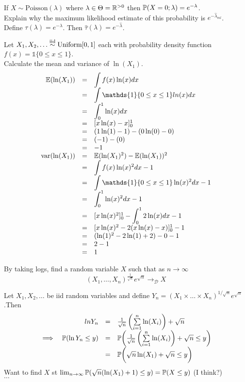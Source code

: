 \documentclass[11pt,a4paper]{article}
\begin{document}
\qpart
If $X\sim\text{Poisson}(\lambda)$ where $\lambda\in\Theta=\mathbb{R}^{>0}$ then $\mathbb{P}(X=0;\lambda)=e^{-\lambda}$.\\
Explain why the maximum likelihood estimate of this probability is $e^{-\hat{\lambda}_{ml}}$.\\

\apart
Define $\tau(\lambda)=e^{-\lambda}$. Then $\hat{\tau}(\lambda)=e^{-\hat{\lambda}}$.

\question
Let $X_1,X_2,\dots\overset{\text{iid}}{\sim}\text{Uniform}[0,1]$ each with probability density function $f(x)=\mathds{1}\{0\leq x\leq1\}$.\\

\qpartnb Calculate the mean and variance of $\ln(X_1)$.\\

\apart
\[\begin{array}{rcl}
\expect(\ln(X_1))&=&{\displaystyle\int f(x)\ln(x)dx}\\
&=&{\displaystyle\int\mathds{1}\{0\leq x\leq1\}ln(x)dx}\\
&=&{\displaystyle\int_0^1\ln(x)dx}\\
&=&[x\ln(x)-x]_0^1\\
&=&(1\ln(1)-1)-(0\ln(0)-0)\\
&=&(-1)-(0)\\
&=&-1\\
\var(\ln(X_1))&=&\expect(\ln(X_1)^2)-\expect(\ln(X_1))^2\\
&=&{\displaystyle\int f(x)\ln(x)^2dx-1}\\
&=&{\displaystyle\int \mathds{1}\{0\leq x\leq1\}\ln(x)^2dx-1}\\
&=&{\displaystyle\int_0^1\ln(x)^2dx-1}\\
&=&{[x\ln(x)^2]_0^1-\displaystyle\int_0^12\ln(x)dx-1}\\
&=&[x\ln(x)^2-2(x\ln(x)-x)]_0^1-1\\
&=&(\ln(1)^2-2\ln(1)+2)-0-1\\
&=&2-1\\
&=&1
\end{array}\]


\qpartnb By taking logs, find a random variable $X$ such that as $n\to\infty$
$$(X_1,\dots,X_n)^{\frac{1}{\sqrt{n}}}e^{\sqrt{n}}\to_\mathcal{D}X$$

\apart
Let $X_1,X_2,\dots$ be iid random variables and define $Y_n=(X_1\times\dots\times X_n)^{1/\sqrt{n}}e^{\sqrt{n}}$.Then
\[\begin{array}{rrcl}
&ln Y_n&=&\frac{1}{\sqrt{n}}\left(\sum\limits_{i=1}^n\ln(X_i)\right)+\sqrt{n}\\
\implies&\mathbb{P}(\ln Y_n\leq y)&=&\mathbb{P}\bigg(\frac{1}{\sqrt{n}}\left(\sum\limits_{i=1}^n\ln(X_i)\right)+\sqrt{n}\leq y\bigg)\\
&&=&\mathbb{P}\bigg(\sqrt{n}\ln(X_1)+\sqrt{n}\leq y\bigg)
\end{array}\]
Want to find $X$ st $\lim_{n\to\infty}\mathbb{P}(\sqrt{n}(\ln(X_1)+1)\leq y)=\mathbb{P}(X\leq y)$ (I think?)\\
$\dots$
\end{document}
